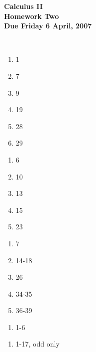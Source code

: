 \documentclass[12pt]{article}
\begin{document}
\pagestyle{empty}
 
\begin{center}
{\large {\bf Calculus II}}\\
\medskip
{\large {\bf Homework Two}}\\
\medskip
{ {\bf Due Friday 6 April, 2007}}\\
\end{center}

\hspace{2mm}\\


\begin{enumerate}
\setlength{\itemsep}{-1mm}
  \item 1
  \item 7
  \item 9
  \item 19
  \item 28
  \item 29


\end{enumerate}


\begin{enumerate}
\setlength{\itemsep}{-1mm}
  \item 6
  \item 10
  \item 13
  \item 15
  \item 23

\end{enumerate}



\begin{enumerate}
\setlength{\itemsep}{-1mm}
  \item 7
  \item 14-18
  \item 26
  \item 34-35
  \item 36-39

\end{enumerate}



\begin{enumerate}
\setlength{\itemsep}{-1mm}
  \item 1-6
\end{enumerate}


\begin{enumerate}
\setlength{\itemsep}{-1mm}
  \item 1-17, odd only
\end{enumerate}
\end{document}
